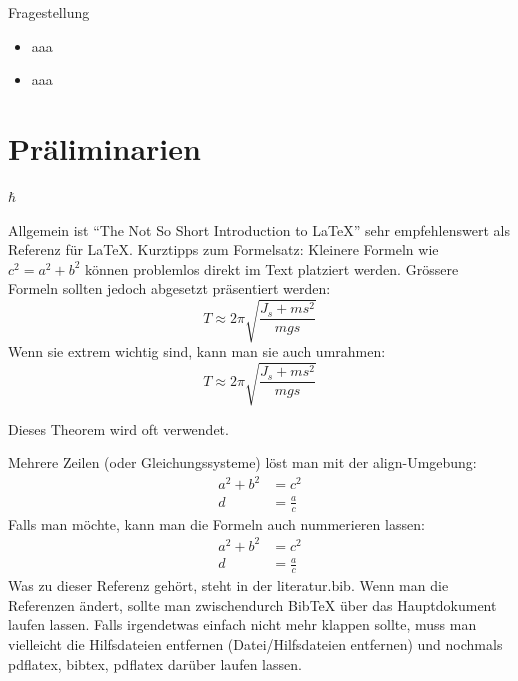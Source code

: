 \documentclass[11pt,DIV=10,final]{scrreprt} %
\begin{document}
Fragestellung
\begin{itemize}
	\item aaa
	\item aaa
\end{itemize}

\chapter{Präliminarien}
$\hbar$

Allgemein ist ``The Not So Short Introduction to LaTeX'' sehr empfehlenswert als Referenz für \LaTeX. Kurztipps zum Formelsatz: Kleinere Formeln wie $c^2=a^2+b^2$ können problemlos direkt im Text platziert werden. Grössere Formeln sollten jedoch abgesetzt präsentiert werden:
\[
	T\approx 2\pi\sqrt{\frac{J_s+ms^2}{mgs}}
\]
Wenn sie extrem wichtig sind, kann man sie auch umrahmen:
\[
	\boxed{T\approx 2\pi\sqrt{\frac{J_s+ms^2}{mgs}}}
\]

Dieses Theorem \citep[S.~117]{alexandrov55} wird oft verwendet.







Mehrere Zeilen (oder Gleichungssysteme) löst man mit der align-Umgebung:
\begin{align*}
	a^2+b^2 &= c^2\\
	d &= \frac{a}{c}
\end{align*}
Falls man möchte, kann man die Formeln auch nummerieren lassen:
\begin{align}
	a^2+b^2 &= c^2\\
	d &= \frac{a}{c}
\end{align}
Was zu dieser Referenz gehört, steht in der literatur.bib. Wenn man die Referenzen ändert, sollte man zwischendurch BibTeX über das Hauptdokument laufen lassen. Falls irgendetwas einfach nicht mehr klappen sollte, muss man vielleicht die Hilfsdateien entfernen (Datei/Hilfsdateien entfernen) und nochmals pdflatex, bibtex, pdflatex darüber laufen lassen.
\end{document}
